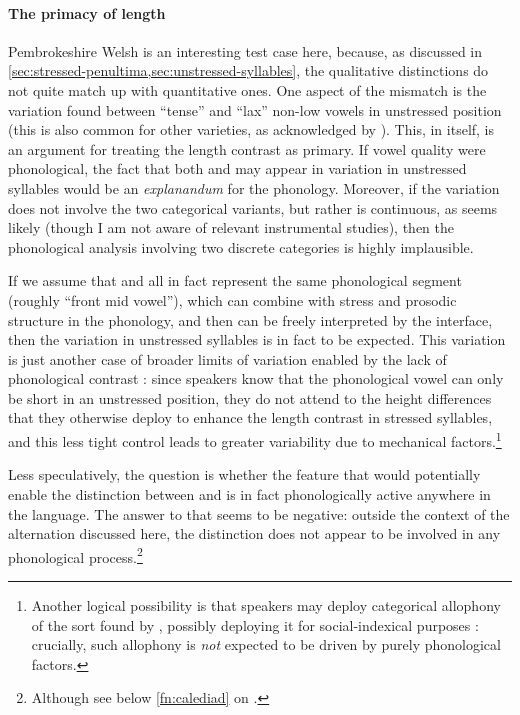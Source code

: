 \paragraph{The primacy of length}
\label{sec:primacy-length}

Pembrokeshire Welsh is an interesting test case here, because, as discussed in \cref{sec:stressed-penultima,sec:unstressed-syllables}, the qualitative distinctions do not quite match up with quantitative ones. One aspect of the mismatch is the variation found between \enquote{tense} and \enquote{lax} non-low vowels in unstressed position (this is also common for other varieties, as acknowledged by \citealp[p.~54]{jones}). This, in itself, is an argument for treating the length contrast as primary. If vowel quality were phonological, the fact that both \ipa{[e]} and \ipa{[ɛ]} may appear in variation in unstressed syllables would be an \emph{explanandum} for the phonology. Moreover, if the variation does not involve the two categorical variants, but rather is continuous, as seems likely (though I am not aware of relevant instrumental studies), then the phonological analysis involving two discrete categories is highly implausible.

If we assume that  and  all in fact represent the same phonological segment (roughly \enquote{front mid vowel}), which can combine with stress and prosodic structure in the phonology, and then can be freely interpreted by the interface, then the variation in unstressed syllables is in fact to be expected. This variation is just another case of broader limits of variation enabled by the lack of phonological contrast \citep{keating88:_under,keating90:_phonet,dyck95:_const,dyck,dresher09}: since speakers know that the phonological vowel \ipa{[e]} can only be short in an unstressed position, they do not attend to the height differences that they otherwise deploy to enhance the length contrast in stressed syllables, and this less tight control leads to greater variability due to mechanical factors.\footnote{Another logical possibility is that speakers may deploy categorical allophony of the sort found by \citet{scobbie09:_dutch,mielke10:_variab_americ_englis}, possibly deploying it for social\hyp indexical purposes \citep{lawson11:_scott_englis}: crucially, such allophony is \emph{not} expected to be driven by purely phonological factors.}

Less speculatively, the question is whether the feature that would potentially enable the distinction between  and  is in fact phonologically active anywhere in the language. The answer to that seems to be negative: outside the context of the alternation discussed here, the distinction does not appear to be involved in any phonological process.\footnote{Although see below \cref{fn:calediad} on .}

